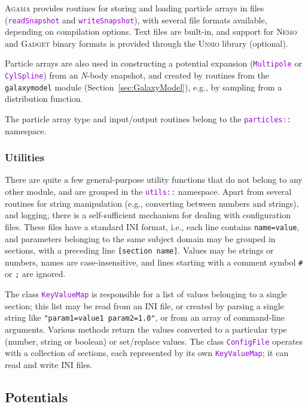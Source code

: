 \documentclass[12pt]{article}
\newcommand{\Agama}{\textsc{Agama}\xspace}
\newcommand{\Nemo} {\textsc{Nemo}\xspace}
\newcommand{\Nbody}{\textsl{N}-body\xspace}
\newcommand{\ttt}[1]{\textcolor{darkviolet}{\texttt{#1}}}
\newcommand{\ppp}[1]{\textcolor{darkolive} {\texttt{#1}}}
\begin{document}
\Agama provides routines for storing and loading particle arrays in files (\ttt{readSnapshot} and \ttt{writeSnapshot}), with several file formats available, depending on compilation options. Text files are built-in, and support for \Nemo and \textsc{Gadget} binary formats is provided through the \textsc{Unsio} library (optional).

Particle arrays are also used in constructing a potential expansion (\ttt{Multipole} or \ttt{CylSpline}) from an \Nbody snapshot, and created by routines from the \texttt{galaxymodel} module (Section~\ref{sec:GalaxyModel}), e.g., by sampling from a distribution function.

The particle array type and input/output routines belong to the \ttt{particles::} name\-space.


\subsubsection{Utilities}  \label{sec:Utilities}

There are quite a few general-purpose utility functions that do not belong to any other module, and are grouped in the \ttt{utils::} namespace. 
Apart from several routines for string manipulation (e.g., converting between numbers and strings), and logging, there is a self-sufficient mechanism for dealing with configuration files. These files have a standard INI format, i.e., each line contains \ppp{name=value}, and parameters belonging to the same subject domain may be grouped in sections, with a preceding line \ppp{[section name]}. Values may be strings or numbers, names are case-insensitive, and lines starting with a comment symbol \texttt{\#} or \texttt{;} are ignored.

The class \ttt{KeyValueMap} is responsible for a list of values belonging to a single section; this list may be read from an INI file, or created by parsing a single string like \ppp{"param1=value1 param2=1.0"}, or from an array of command-line arguments. Various methods return the values converted to a particular type (number, string or boolean) or set/replace values.
The class \ttt{ConfigFile} operates with a collection of sections, each represented by its own \ttt{KeyValueMap}; it can read and write INI files.


\subsection{Potentials}  \label{sec:Potential}
\end{document}
